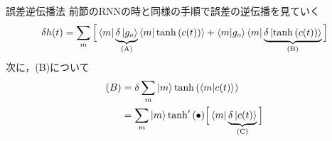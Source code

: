\documentclass[dvipdfmx,8pt]{beamer}
\begin{document}
  \begin{frame}[t]{誤差逆伝播法}
    前節のRNNの時と同様の手順で誤差の逆伝播を見ていく\\
    \begin{equation*}
      \delta{h(t)} = \sum_{m}\Big[ \bra{m}\underbrace{\delta\ket{g_o}}_{\text{(A)}}\braket{m|\tanh{(c(t))}} + \braket{m|g_o}\bra{m}\underbrace{\delta \ket{\tanh{(c(t))}}}_{\text{(B)}} \Big]
    \end{equation*}
    次に，(B)について
    \begin{align*}
      (B) &= \delta\sum_{m}\ket{m}\tanh{(\braket{m|c(t)})}\\
      &= \sum_{m}\ket{m}\tanh'{(\bullet)}\Big[ \bra{m}\underbrace{\delta\ket{c(t)}}_{\text{(C)}}  \Big]
    \end{align*}
  \end{frame}
\end{document}
